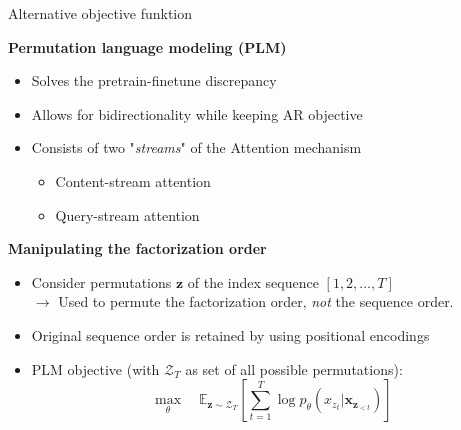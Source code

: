 \documentclass[]{beamer}
\begin{document}
\begin{frame}{Alternative objective funktion}

	\textbf{Permutation language modeling (PLM)}
	
	\begin{itemize}
		\item Solves the pretrain-finetune discrepancy
		\item Allows for bidirectionality while keeping AR objective
		\item Consists of two "\textit{streams}" of the Attention mechanism
				\begin{itemize}
					\item Content-stream attention
					\item Query-stream attention
				\end{itemize}
	\end{itemize}

	\vspace{.3cm}
	
	\textbf{Manipulating the factorization order}
	
	\begin{itemize}
		\item Consider permutations $\mathbf{z}$ of the index sequence $[1,2, \hdots, T]$\\
					$\rightarrow$ Used to permute the factorization order, \textit{not} the sequence order.
		\item Original sequence order is retained by using positional encodings
		\item PLM objective (with $\mathcal{Z}_T$ as set of all possible permutations):
					$$\max_{\theta} \quad \mathds{E}_{\mathbf{z}\sim\mathcal{Z}_T} \left[ \sum_{t=1}^{T} \log p_\theta (x_{z_t} | \mathbf{x}_{\mathbf{z}_{< t}}) \right]$$
	\end{itemize}
\end{frame}
\end{document}
